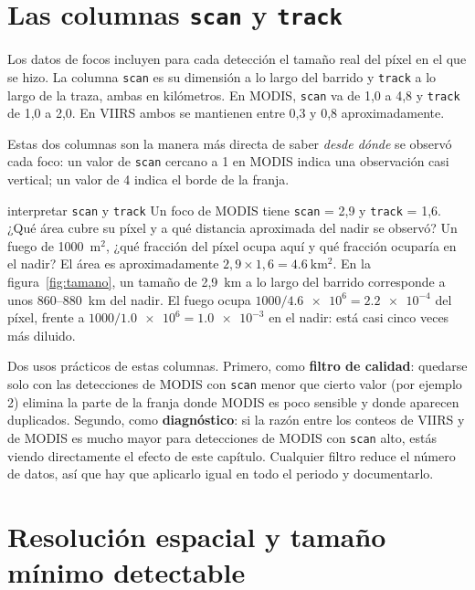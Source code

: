 \section{Las columnas \texttt{scan} y \texttt{track}}

Los datos de focos incluyen para cada detección el tamaño real del píxel en el que se hizo. La
columna \texttt{scan} es su dimensión a lo largo del barrido y \texttt{track} a lo largo de la
traza, ambas en kilómetros. En MODIS, \texttt{scan} va de 1,0 a 4,8 y \texttt{track} de 1,0 a
2,0. En VIIRS ambos se mantienen entre 0,3 y 0,8 aproximadamente.

Estas dos columnas son la manera más directa de saber \emph{desde dónde} se observó cada foco:
un valor de \texttt{scan} cercano a 1 en MODIS indica una observación casi vertical; un valor de
4 indica el borde de la franja.

\begin{ejemplo}{interpretar \texttt{scan} y \texttt{track}}
Un foco de MODIS tiene \texttt{scan} = 2,9 y \texttt{track} = 1,6. ¿Qué área cubre su píxel y a
qué distancia aproximada del nadir se observó? Un fuego de 1000~m$^2$, ¿qué fracción del píxel
ocupa aquí y qué fracción ocuparía en el nadir?
\solucion El área es aproximadamente $2{,}9 \times 1{,}6 = \SI{4.6}{\kilo\metre\squared}$. En
la figura~\ref{fig:tamano}, un tamaño de 2,9~km a lo largo del barrido corresponde a unos
860--880~km del nadir. El fuego ocupa $1000/\num{4.6e6} = \num{2.2e-4}$ del píxel, frente a
$1000/\num{1.0e6} = \num{1.0e-3}$ en el nadir: está casi cinco veces más diluido.
\end{ejemplo}

\begin{parareto}
Dos usos prácticos de estas columnas. Primero, como \textbf{filtro de calidad}: quedarse solo
con las detecciones de MODIS con \texttt{scan} menor que cierto valor (por ejemplo 2) elimina
la parte de la franja donde MODIS es poco sensible y donde aparecen duplicados. Segundo, como
\textbf{diagnóstico}: si la razón entre los conteos de VIIRS y de MODIS es mucho mayor para
detecciones de MODIS con \texttt{scan} alto, estás viendo directamente el efecto de este
capítulo. Cualquier filtro reduce el número de datos, así que hay que aplicarlo igual en todo el
periodo y documentarlo.
\end{parareto}

\section{Resolución espacial y tamaño mínimo detectable}

